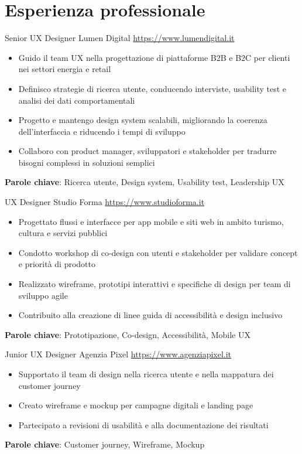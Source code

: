 \documentclass[a4paper, serif, 10pt]{moderncv}
\begin{document}
\section{Esperienza professionale}

        {Senior UX Designer}
        {Lumen Digital}
        {\url{https://www.lumendigital.it}}
        {}
        {\begin{itemize}
\item Guido il team UX nella progettazione di piattaforme B2B e B2C per clienti nei settori energia e retail
\item Definisco strategie di ricerca utente, conducendo interviste, usability test e analisi dei dati comportamentali
\item Progetto e mantengo design system scalabili, migliorando la coerenza dell'interfaccia e riducendo i tempi di sviluppo
\item Collaboro con product manager, sviluppatori e stakeholder per tradurre bisogni complessi in soluzioni semplici
\end{itemize}
\textbf{Parole chiave}: Ricerca utente, Design system, Usability test, Leadership UX}

        {UX Designer}
        {Studio Forma}
        {\url{https://www.studioforma.it}}
        {}
        {\begin{itemize}
\item Progettato flussi e interfacce per app mobile e siti web in ambito turismo, cultura e servizi pubblici
\item Condotto workshop di co-design con utenti e stakeholder per validare concept e priorità di prodotto
\item Realizzato wireframe, prototipi interattivi e specifiche di design per team di sviluppo agile
\item Contribuito alla creazione di linee guida di accessibilità e design inclusivo
\end{itemize}
\textbf{Parole chiave}: Prototipazione, Co-design, Accessibilità, Mobile UX}

        {Junior UX Designer}
        {Agenzia Pixel}
        {\url{https://www.agenziapixel.it}}
        {}
        {\begin{itemize}
\item Supportato il team di design nella ricerca utente e nella mappatura dei customer journey
\item Creato wireframe e mockup per campagne digitali e landing page
\item Partecipato a revisioni di usabilità e alla documentazione dei risultati
\end{itemize}
\textbf{Parole chiave}: Customer journey, Wireframe, Mockup}
\end{document}

